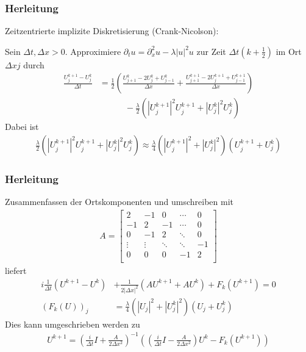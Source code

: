 \documentclass{beamer}
\begin{document}

\begin{frame}
    \frametitle{Herleitung}

    Zeitzentrierte implizite Diskretisierung {\small(Crank-Nicolson)}:

    Sein $\Delta t, \Delta x>0$.
    Approximiere $\partial_t u = \partial_x^2 u - \lambda |u|^2u$ zur Zeit $\Delta t (k+\frac{1}{2})$ im Ort $\Delta x j$ durch
    \begin{align*}
        \frac{U^{k+1}_j-U^{k}_j}{\Delta t} &= \frac{1}{2}(\frac{U^{k}_{j+1}-2U^{k}_j+U^{k}_{j-1}}{\Delta x}+\frac{U^{k+1}_{j+1}-2U^{k+1}_j+U^{k+1}_{j-1}}{\Delta x})\\
        &\quad\qquad -\frac{\lambda}{2}(|U^{k+1}_j|^2U^{k+1}_j+|U^{k}_j|^2U^{k}_j)
    \end{align*}
    Dabei ist
    \begin{align*}
        \frac{\lambda}{2}(|U^{k+1}_j|^2U^{k+1}_j+|U^{k}_j|^2U^{k}_j) \approx \frac{\lambda}{4}(|U^{k+1}_j|^2+|U_j^k|^2)(U^{k+1}_j+U_j^k)
    \end{align*}
    

\end{frame}

\begin{frame}
    \frametitle{Herleitung}

    Zusammenfassen der Ortskomponenten und umschreiben mit 
    \begin{align*}
        A = \begin{bmatrix}
            2  & -1 &  0  &  \cdots  & 0 \\
            -1  & 2 &  -1  &  \cdots  & 0 \\
            0  & -1 &  2  &  \ddots  & 0 \\
            \vdots & \vdots & \ddots & \ddots & -1 \\
            0 & 0 & 0 & -1 & 2\\
        \end{bmatrix}
    \end{align*}
    liefert
    \begin{align*}
        i\frac{1}{\Delta t}(U^{k+1}-U^k)&+\frac{1}{2|\Delta x|^2}(AU^{k+1}+AU^k)+F_k(U^{k+1})=0\\
        (F_k(U))_j &= \frac{\lambda}{4}(|U_j|^2+|U_j^k|^2)(U_j+U_j^k)
    \end{align*}
    Dies kann umgeschrieben werden zu
    \begin{align*}
        U^{k+1} = (\frac{i}{\Delta t}I + \frac{A}{2\Delta x^2})^{-1}((\frac{i}{\Delta t}I - \frac{A}{2\Delta x^2})U^k - F_k(U^{k+1}))
    \end{align*}

\end{frame}
\end{document}
